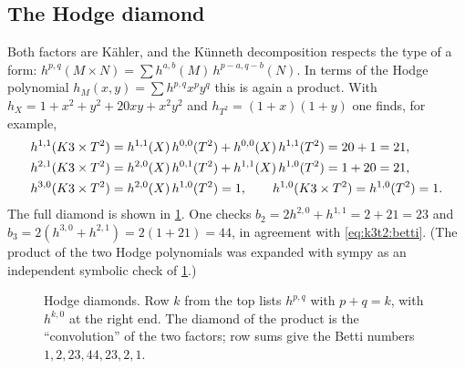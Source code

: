 \subsection{The Hodge diamond}
Both factors are K\"ahler, and the K\"unneth decomposition respects the type of a form:
$h^{p,q}(M\times N)=\sum h^{a,b}(M)\,h^{p-a,q-b}(N)$. In terms of the Hodge polynomial
$h_M(x,y)=\sum h^{p,q}x^py^q$ this is again a product. With
$h_X=1+x^2+y^2+20xy+x^2y^2$ and $h_{T^2}=(1+x)(1+y)$ one finds, for example,
\begin{align}
 h^{1,1}(K3\times T^2)&=h^{1,1}(X)\,h^{0,0}(T^2)+h^{0,0}(X)\,h^{1,1}(T^2)=20+1=21,\notag\\
 h^{2,1}(K3\times T^2)&=h^{2,0}(X)\,h^{0,1}(T^2)+h^{1,1}(X)\,h^{1,0}(T^2)=1+20=21,\label{eq:k3t2:hodge}\\
 h^{3,0}(K3\times T^2)&=h^{2,0}(X)\,h^{1,0}(T^2)=1,\qquad h^{1,0}(K3\times T^2)=h^{1,0}(T^2)=1 .\notag
\end{align}
The full diamond is shown in \cref{fig:k3t2:diamond}. One checks
$b_2=2h^{2,0}+h^{1,1}=2+21=23$ and $b_3=2(h^{3,0}+h^{2,1})=2(1+21)=44$, in agreement with
\eqref{eq:k3t2:betti}. (The product of the two Hodge polynomials was expanded with sympy as
an independent symbolic check of \cref{fig:k3t2:diamond}.)

\begin{figure}[ht]
\centering
{}
\caption{Hodge diamonds. Row $k$ from the top lists $h^{p,q}$ with $p+q=k$, with $h^{k,0}$
at the right end. The diamond of the product is the ``convolution'' of the two factors;
row sums give the Betti numbers $1,2,23,44,23,2,1$.}
\label{fig:k3t2:diamond}
\end{figure}

